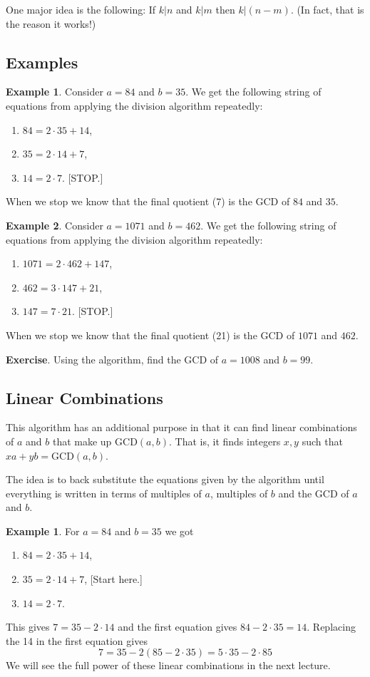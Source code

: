 \documentclass[11pt]{article}
\theoremstyle{definition}
\numberwithin{thm}{section}
\begin{document}
One major idea is the following: If $k | n$ and $k | m$ then $k|(n-m)$. (In fact, that is the reason it works!)

\subsection{Examples}

\textbf{Example 1}. Consider $a = 84$ and $b = 35$. We get the following string of equations from applying the division algorithm repeatedly:
\begin{enumerate}
	\item $84 = 2 \cdot 35 + 14$,
    \item $35 = 2 \cdot 14 + 7$,
    \item $14 = 2 \cdot 7$. [STOP.]
\end{enumerate}
When we stop we know that the final quotient (7) is the GCD of $84$ and $35$.

\textbf{Example 2}. Consider $a = 1071$ and $b = 462$. We get the following string of equations from applying the division algorithm repeatedly:
\begin{enumerate}
	\item $1071 = 2 \cdot 462 + 147$,
    \item $462 = 3 \cdot 147 + 21$,
    \item $147 = 7 \cdot 21$. [STOP.]
\end{enumerate}
When we stop we know that the final quotient (21) is the GCD of $1071$ and $462$.

\textbf{Exercise}. Using the algorithm, find the GCD of $a = 1008$ and $b= 99$.

\subsection{Linear Combinations}

This algorithm has an additional purpose in that it can find linear combinations of $a$ and $b$ that make up $\text{GCD}(a,b)$. That is, it finds integers $x,y$ such that $xa + yb = \text{GCD}(a,b)$.

The idea is to back substitute the equations given by the algorithm until everything is written in terms of multiples of $a$, multiples of $b$ and the GCD of $a$ and $b$.

\textbf{Example 1}. For $a = 84$ and $b = 35$ we got
\begin{enumerate}
	\item $84 = 2 \cdot 35 + 14$,
    \item $35 = 2 \cdot 14 + 7$, [Start here.]
    \item $14 = 2 \cdot 7$.
\end{enumerate}
This gives $7 = 35 - 2 \cdot 14$ and the first equation gives $84 - 2 \cdot 35 = 14$. Replacing the 14 in the first equation gives
\[
	7 = 35 - 2(85 - 2 \cdot 35) = 5 \cdot 35 - 2 \cdot 85
\]
We will see the full power of these linear combinations in the next lecture.
\end{document}

